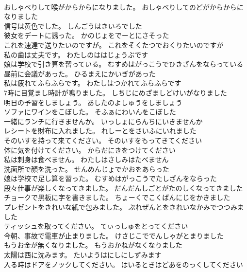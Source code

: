 \documentclass[8pt]{extreport}
\begin{document}
\begin{CJK}{UTF8}{min}
\\	おしゃべりして喉がからからになりました。	おしゃべりしてのどがからからになりました 
\\	信号は黄色でした。	しんごうはきいろでした 
\\	彼女をデートに誘った。	かのじょをでーとにさそった 
\\	これを速達で送りたいのですが。	これをそくたつでおくりたいのですが 
\\	私の歯は丈夫です。	わたしのははじょうぶです 
\\	娘は学校で引き算を習っている。	むすめはがっこうでひきざんをならっている 
\\	昼前に会議があった。	ひるまえにかいぎがあった 
\\	私は疲れてふらふらです。	わたしはつかれてふらふらです 
\\	7時に目覚まし時計が鳴りました。	しちじにめざましどけいがなりました 
\\	明日の予習をしましょう。	あしたのよしゅうをしましょう 
\\	ソファにワインをこぼした。	そふぁにわいんをこぼした 
\\	一緒にランチに行きませんか。	いっしょにらんちにいきませんか 
\\	レシートを財布に入れました。	れしーとをさいふにいれました 
\\	そのいすを持って来てください。	そのいすをもってきてください 
\\	体に気を付けてください。	からだにきをつけてください 
\\	私は刺身は食べません。	わたしはさしみはたべません 
\\	洗面所で顔を洗った。	せんめんじょでかおをあらった 
\\	娘は学校で足し算を習った。	むすめはがっこうでたしざんをならった 
\\	段々仕事が楽しくなってきました。	だんだんしごとがたのしくなってきました 
\\	チョークで黒板に字を書きました。	ちょーくでこくばんにじをかきました 
\\	プレゼントをきれいな紙で包みました。	ぷれぜんとをきれいなかみでつつみました 
\\	ティッシュを取ってください。	てぃっしゅをとってください 
\\	今朝、事故で電車が止まりました。	けさじこででんしゃがとまりました 
\\	もうお金が無くなりました。	もうおかねがなくなりました 
\\	太陽は西に沈みます。	たいようはにしにしずみます 
\\	入る時はドアをノックしてください。	はいるときはどあをのっくしてください 

\end{CJK}
\end{document}
